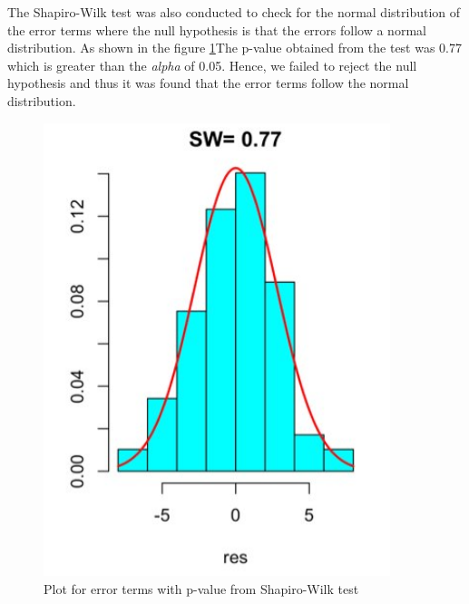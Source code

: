 The Shapiro-Wilk test was also conducted to check for the normal distribution of the error terms where the null hypothesis is that the errors follow a normal distribution. As shown in the figure \ref{fig:shapiro}The p-value obtained from the test was 0.77 which is greater than the \textit{alpha} of 0.05. Hence, we failed to reject the null hypothesis and thus it was found that the error terms follow the normal distribution. 

\begin{figure}
  \centering
  \includegraphics[width = 0.9\textwidth]{figures/Shapiro.PNG}
  \caption{Plot for error terms with p-value from Shapiro-Wilk test}
  \label{fig:shapiro}
\end{figure}



